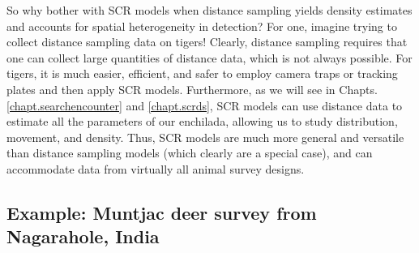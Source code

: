 So why bother with SCR models when distance sampling yields density
estimates and accounts for spatial heterogeneity in detection? For
one, imagine trying to collect distance sampling data on tigers!
Clearly, distance sampling requires that one can collect large
quantities of distance data, which is not always possible. For tigers,
it is much easier, efficient, and safer to employ camera traps or
tracking plates and then apply SCR models. Furthermore, as we will see
in Chapts.
\ref{chapt.searchencounter} and \ref{chapt.scrds}, SCR models can use distance data to estimate all the
parameters of our enchilada, allowing us to study distribution,
movement, and density. Thus, SCR models are much more general and
versatile than distance sampling models (which clearly are a special
case), and can accommodate data from virtually all animal survey
designs.


\subsection{Example: Muntjac deer survey from Nagarahole, India }

